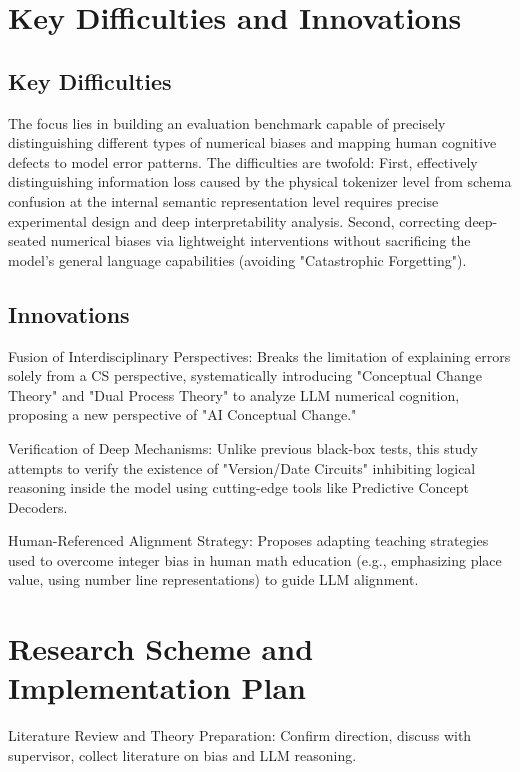 \section{Key Difficulties and Innovations}

\subsection{Key Difficulties}

The focus lies in building an evaluation benchmark capable of precisely distinguishing different types of numerical biases and mapping human cognitive defects to model error patterns. The difficulties are twofold: First, effectively distinguishing information loss caused by the physical tokenizer level from schema confusion at the internal semantic representation level requires precise experimental design and deep interpretability analysis. Second, correcting deep-seated numerical biases via lightweight interventions without sacrificing the model's general language capabilities (avoiding "Catastrophic Forgetting")\cite{ohlsson1996}.

\subsection{Innovations}

Fusion of Interdisciplinary Perspectives: Breaks the limitation of explaining errors solely from a CS perspective, systematically introducing "Conceptual Change Theory" and "Dual Process Theory" to analyze LLM numerical cognition, proposing a new perspective of "AI Conceptual Change."

Verification of Deep Mechanisms: Unlike previous black-box tests, this study attempts to verify the existence of "Version/Date Circuits" inhibiting logical reasoning inside the model using cutting-edge tools like Predictive Concept Decoders.

Human-Referenced Alignment Strategy: Proposes adapting teaching strategies used to overcome integer bias in human math education (e.g., emphasizing place value, using number line representations) to guide LLM alignment\cite{siegler2011}.

\section{Research Scheme and Implementation Plan}

Literature Review and Theory Preparation: Confirm direction, discuss with supervisor, collect literature on bias and LLM reasoning.

